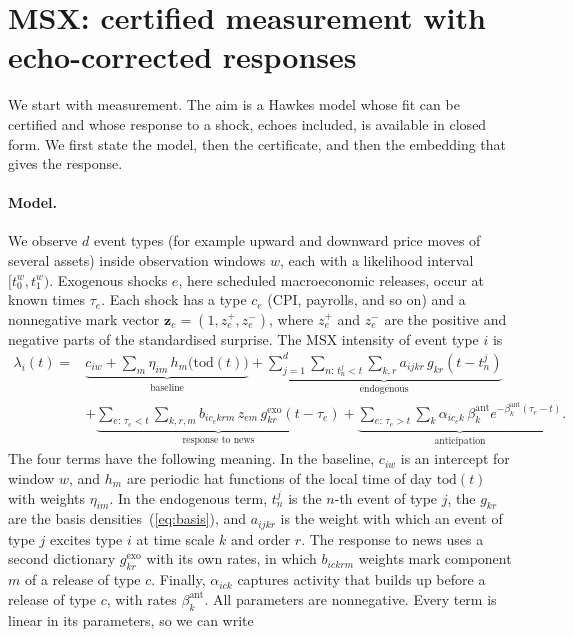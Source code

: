 \section{MSX: certified measurement with echo-corrected responses}\label{sec:msx}

We start with measurement. The aim is a Hawkes model whose fit can be certified and whose response
to a shock, echoes included, is available in closed form. We first state the model, then the
certificate, and then the embedding that gives the response.

\paragraph{Model.} We observe $d$ event types (for example upward and downward price moves of
several assets) inside observation windows $w$, each with a likelihood interval
$[t_0^w,t_1^w)$. Exogenous shocks $e$, here scheduled macroeconomic releases, occur at known times
$\tau_e$. Each shock has a type $c_e$ (CPI, payrolls, and so on) and a nonnegative mark vector
$\bm z_e=(1,z_e^+,z_e^-)$, where $z_e^+$ and $z_e^-$ are the positive and negative parts of the
standardised surprise. The MSX intensity of event type $i$ is
\begin{align}
\lambda_i(t)={}&\underbrace{c_{iw}+\sum_{m}\eta_{im}\,h_m\bigl(\mathrm{tod}(t)\bigr)}_{\text{baseline}}
+\underbrace{\sum_{j=1}^{d}\sum_{n:\,t_n^j<t}\sum_{k,r}a_{ijkr}\,g_{kr}(t-t_n^j)}_{\text{endogenous}}\nonumber\\
&+\underbrace{\sum_{e:\,\tau_e<t}\sum_{k,r,m}b_{i c_e k r m}\,z_{em}\,g^{\mathrm{exo}}_{kr}(t-\tau_e)}_{\text{response to news}}
+\underbrace{\sum_{e:\,\tau_e>t}\sum_{k}\alpha_{ic_ek}\,\beta^{\mathrm{ant}}_k e^{-\beta^{\mathrm{ant}}_k(\tau_e-t)}}_{\text{anticipation}} .
\label{eq:intensity}
\end{align}
The four terms have the following meaning. In the baseline, $c_{iw}$ is an intercept for window
$w$, and $h_m$ are periodic hat functions of the local time of day $\mathrm{tod}(t)$ with weights
$\eta_{im}$. In the endogenous term, $t_n^j$ is the $n$-th event of type $j$, the $g_{kr}$ are the
basis densities~(\ref{eq:basis}), and $a_{ijkr}$ is the weight with which an event of type $j$
excites type $i$ at time scale $k$ and order $r$. The response to news uses a second dictionary
$g^{\mathrm{exo}}_{kr}$ with its own rates, in which $b_{ickrm}$ weights mark component $m$ of a
release of type $c$. Finally, $\alpha_{ick}$ captures activity that builds up before a release of
type $c$, with rates $\beta^{\mathrm{ant}}_k$. All parameters are nonnegative. Every term is linear in its parameters, so we can write
